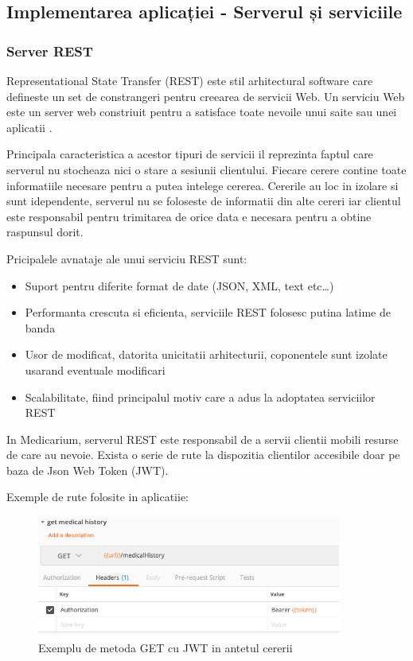 \documentclass[12pt]{article}
\begin{document}
\subsection{Implementarea aplicației - Serverul și serviciile}

\subsubsection{Server REST}

Representational State Transfer (REST) este stil arhitectural software care defineste
un set de constrangeri pentru creearea de servicii Web. Un serviciu Web este un server web
constriuit pentru a satisface toate nevoile unui saite sau unei aplicatii \cite{masse2011rest}.

Principala caracteristica a acestor tipuri de servicii il reprezinta faptul care serverul
nu stocheaza nici o stare a sesiunii clientului. Fiecare cerere contine toate informatiile
necesare pentru a putea intelege cererea. Cererile au loc in izolare si sunt idependente, serverul
nu se foloseste de informatii din alte cereri iar clientul este responsabil pentru trimitarea de
orice data e necesara pentru a obtine raspunsul dorit.

Pricipalele avnataje ale unui serviciu REST sunt:

\begin{itemize}
    \item Suport pentru diferite format de date (JSON, XML, text etc\dots)
    \item Performanta crescuta si eficienta, serviciile REST folosesc putina latime de banda
    \item Usor de modificat, datorita unicitatii arhitecturii, coponentele sunt izolate
    usarand eventuale modificari
    \item Scalabilitate, fiind principalul motiv care a adus la adoptatea serviciilor REST \cite{masse2011rest}
\end{itemize}

In Medicarium, serverul REST este responsabil de a servii clientii mobili resurse de
care au nevoie. Exista o serie de rute la dispozitia clientilor accesibile doar pe baza 
de Json Web Token (JWT). 

\bigskip

Exemple de rute folosite in aplicatiie:


\begin{figure}[H]
\centering
\includegraphics[width=10cm, height=4cm]{get.png}
\caption{Exemplu de metoda GET cu JWT in antetul cererii}
\end{figure}
\end{document}
